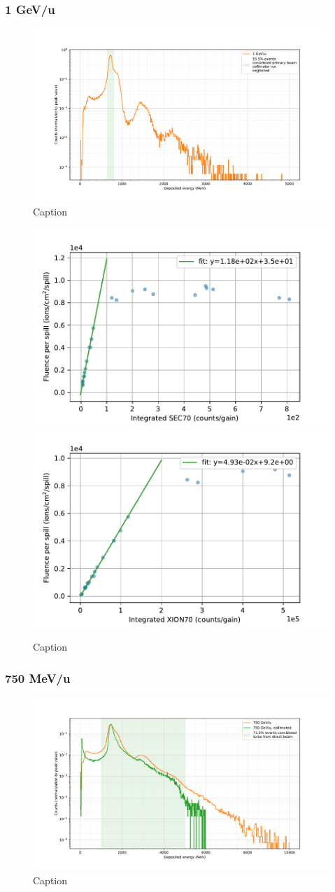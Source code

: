 

\subsubsection{1 GeV/u}
    \begin{figure}
        \centering
        \includegraphics[width=0.48\columnwidth]{images/SEC_XION_DIODE_FLUX/1000.pdf}
        \caption{Caption}
        \label{fig:my_label1}
    \end{figure}

    \begin{figure}
        \centering
        \includegraphics[width=0.48\columnwidth]{images/SEC_XION_DIODE_FLUX/1000_sec.pdf}
        \includegraphics[width=0.48\columnwidth]{images/SEC_XION_DIODE_FLUX/1000_xion.pdf}
        \caption{Caption}
        \label{fig:my_label2}
    \end{figure}
    
\subsubsection{750 MeV/u}
    \begin{figure}
        \centering
        \includegraphics[width=0.48\columnwidth]{images/SEC_XION_DIODE_FLUX/750.pdf}
        \caption{Caption}
        \label{fig:my_label3}
    \end{figure}

